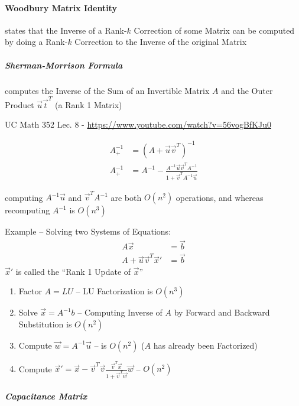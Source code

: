 \paragraph{Woodbury Matrix Identity}\label{sec:woodbury_matrix_identity}\hfill

states that the Inverse of a Rank-$k$ Correction of some Matrix can be computed
by doing a Rank-$k$ Correction to the Inverse of the original Matrix



\subparagraph{Sherman-Morrison Formula}\label{sec:sherman_morrison}\hfill

computes the Inverse of the Sum of an Invertible Matrix $A$ and the Outer
Product $\vec{u}\vec{t}^T$ (a Rank 1 Matrix)

UC Math 352 Lec. 8 - \url{https://www.youtube.com/watch?v=56vogBfKJu0}

\begin{align*}
  A_+^{-1} & = (A + \vec{u}\vec{v}^T)^{-1} \\
  A_+^{-1} & = A^{-1} -
    \frac{A^{-1}\vec{u}\vec{v}^TA^{-1}}{1 + \vec{v}^TA^{-1}\vec{u}}
\end{align*}

computing $A^{-1}\vec{u}$ and $\vec{v}^TA^{-1}$ are both $O(n^2)$ operations,
and whereas recomputing $A^{-1}$ is $O(n^3)$

\asterism

Example -- Solving two Systems of Equations:
\begin{align*}
  A\vec{x}                     & = \vec{b} \\
  A + \vec{u}\vec{v}^T\vec{x}' & = \vec{b}
\end{align*}
$\vec{x}'$ is called the ``Rank 1 Update of $\vec{x}$''

\begin{enumerate}
  \item Factor $A = LU$ -- LU Factorization is $O(n^3)$
  \item Solve $\vec{x} = A^{-1}b$ -- Computing Inverse of $A$ by Forward and
    Backward Substitution is $O(n^2)$
  \item Compute $\vec{w} = A^{-1}\vec{u}$ -- is $O(n^2)$ ($A$ has already been
    Factorized)
  \item Compute
    $\vec{x}' = \vec{x} - \vec{v}^T\vec{v}
      \frac{\vec{v}^T\vec{x}}{1 + \vec{v}^T\vec{w}} \vec{w}$ -- $O(n^2)$
\end{enumerate}



\subparagraph{Capacitance Matrix}\label{sec:capacitance_matrix}\hfill



